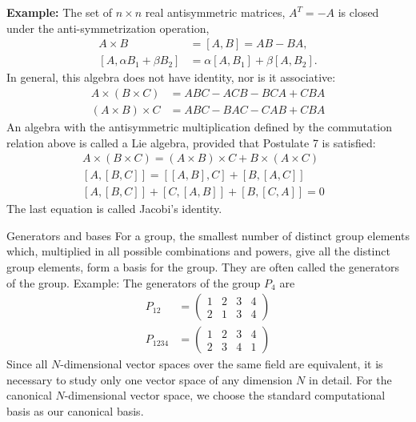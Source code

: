 \documentclass{beamer}
\begin{document}
\begin{frame}
\justify
\textbf{Example:} The set of $n\times n$ real antisymmetric matrices, $A^T = - A$ is closed under the anti-symmetrization operation,
\begin{align}
A \times B & = [A,B] = AB - BA, \\
[A,\alpha B_1 + \beta B_2] & = \alpha [A,B_1] + \beta [A,B_2].
\end{align}
In general, this algebra does not have identity, nor is it associative:
\begin{align}
A \times (B \times C) & = ABC - ACB - BCA + CBA \\
(A \times B) \times C & = ABC - BAC - CAB + CBA
\end{align}
\vfill
An algebra with the antisymmetric multiplication defined by the commutation relation above is called a Lie algebra, provided that Postulate 7 is satisfied:
\begin{align}
A \times (B \times C) = (A \times B) \times C + B \times (A \times C) & \\
[A,[B,C]] = [[A,B],C]+[B,[A,C]] & \\
[A,[B,C]] + [C,[A,B]]+[B,[C,A]] = 0 &
\end{align}
The last equation is called Jacobi's identity.
\end{frame}

\begin{frame}{Generators and bases}
\justify
For a group, the smallest number of distinct group elements which, multiplied in all possible combinations and powers, give all the distinct group elements, form a basis for the group. They are often called the generators of the group.
\vfill
Example: The generators of the group $P_4$ are
\begin{align*}
P_{12} & = \begin{pmatrix} 1 & 2 & 3 & 4 \\ 2 & 1 & 3 & 4 \end{pmatrix} \\
P_{1234} & = \begin{pmatrix} 1 & 2 & 3 & 4 \\ 2 & 3 & 4 & 1 \end{pmatrix}
\end{align*}
\vfill
Since all $N$-dimensional vector spaces over the same field are equivalent, it is necessary to study only one vector space of any dimension $N$ in detail. For the canonical $N$-dimensional vector space, we choose the standard computational basis as our canonical basis.
\end{frame}
\end{document}
